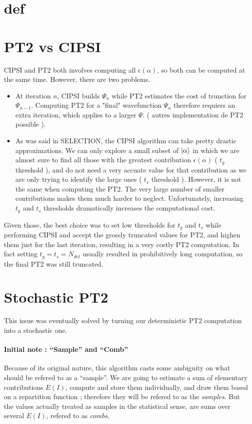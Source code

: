 \documentclass[./thesis.tex]{subfiles}
\begin{document}
\section{def}

\section{PT2 vs CIPSI}

CIPSI and PT2 both involves computing all $\epsilon(\alpha)$, so both can be computed at the same time. However, there are two problems.
\begin{itemize}

\item
At iteration $n$, CIPSI builds $\Psi_n$ while PT2 estimates the cost of trunction for $\Psi_{n-1}$. Computing PT2 for a "final" wavefunction $\Psi_n$ therefore requiers an extra iteration, which applies to a larger $\Psi$. ( autres implementation de PT2 possible ).

\item
As was said in SELECTION, the CIPSI algorithm can take pretty drastic approximations. We can only explore a small subset of $\ket \alpha$ in which we are almost sure to find all those with the greatest contribution $\epsilon(\alpha)$ ( $t_g$ threshold ), and do not need a very accuate value for that contribution as we are only trying to identify the large ones ( $t_s$ threshold ). However, it is not the same when computing the PT2. The very large number of smaller contributions makes them much harder to neglect. Unfortunately, increasing $t_g$ and $t_s$ thresholds dramatically increases the computational cost.

\end{itemize}

Given those, the best choice was to set low thresholds for $t_g$ and $t_s$ while performing CIPSI and accept the grossly truncated values for PT2, and highen them just for the last iteration, resulting in a very costly PT2 computation. In fact setting $t_g = t_s = N_{det}$ usually resulted in prohibitively long computation, so the final PT2 was still truncated.

\section{Stochastic PT2}
This issue was eventually solved by turning our deterministic PT2 computation into a stochastic one.

\paragraph{Initial note : ``Sample'' and ``Comb''}
Because of its original nature, this algorithm casts some ambiguity on what should be refered to as a ``sample''. We are going to estimate a sum of elementary contributions $E(I)$, compute and store them individually, and draw them based on a repartition function ; therefore they will be refered to as the \emph{samples}. But the values actually treated as samples in the statistical sense, are sums over several $E(I)$, refered to as \emph{combs}.
\end{document}

